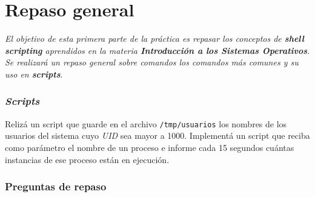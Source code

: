 \section{Repaso general}

\textit{El objetivo de esta primera parte de la práctica es repasar los
  conceptos de \textbf{shell scripting} aprendidos en la materia
  \textbf{Introducción a los Sistemas Operativos}. Se realizará un repaso
  general sobre comandos los comandos más comunes y su uso en
  \textbf{scripts}}.

\subsubsection{\textit{Scripts}}

\begin{questions}
\question Relizá un script que guarde en el archivo \texttt{/tmp/usuarios} los
nombres de los usuarios del sistema cuyo \textit{UID} sea mayor a 1000.
\question Implementá un script que reciba como parámetro el nombre de un
proceso e informe cada 15 segundos cuántas instancias de ese proceso están en
ejecución.
\question 
\end{questions}

\subsubsection{Preguntas de repaso}

